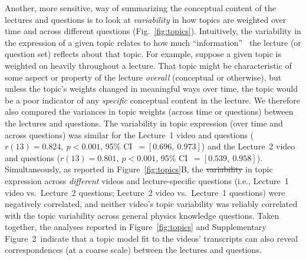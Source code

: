 \documentclass[10pt]{article}
\newcommand{\topicWeights}{2}
\providecommand{\DIFaddtex}[1]{{\protect\color{blue}\uwave{#1}}} %
\providecommand{\DIFdeltex}[1]{{\protect\color{red}\sout{#1}}}                      %
\providecommand{\DIFaddbegin}{} %
\providecommand{\DIFaddend}{} %
\providecommand{\DIFdelbegin}{} %
\providecommand{\DIFdelend}{} %
\providecommand{\DIFadd}[1]{\texorpdfstring{\DIFaddtex{#1}}{#1}} %
\providecommand{\DIFdel}[1]{\texorpdfstring{\DIFdeltex{#1}}{}} %
\newcommand{\DIFscaledelfig}{0.5}
\newlength{\DIFdelgraphicswidth} %
\newlength{\DIFdelgraphicsheight} %
\newcommand{\DIFaddincludegraphics}[2][]{{\color{blue}\fbox{\DIFOincludegraphics[#1]{#2}}}} %
\newcommand{\DIFdelincludegraphics}[2][]{%
\sbox{\DIFdelgraphicsbox}{\DIFOincludegraphics[#1]{#2}}%
\settoboxwidth{\DIFdelgraphicswidth}{\DIFdelgraphicsbox} %
\settoboxtotalheight{\DIFdelgraphicsheight}{\DIFdelgraphicsbox} %
\scalebox{\DIFscaledelfig}{%
\parbox[b]{\DIFdelgraphicswidth}{\usebox{\DIFdelgraphicsbox}\\[-\baselineskip] \rule{\DIFdelgraphicswidth}{0em}}\llap{\resizebox{\DIFdelgraphicswidth}{\DIFdelgraphicsheight}{%
\setlength{\unitlength}{\DIFdelgraphicswidth}%
\begin{picture}(1,1)%
\thicklines\linethickness{2pt} %
{\color[rgb]{1,0,0}\put(0,0){\framebox(1,1){}}}%
{\color[rgb]{1,0,0}\put(0,0){\line( 1,1){1}}}%
{\color[rgb]{1,0,0}\put(0,1){\line(1,-1){1}}}%
\end{picture}%
}\hspace*{3pt}}} %
} %
\DeclareRobustCommand{\DIFaddbegin}{\DIFOaddbegin \let\includegraphics\DIFaddincludegraphics} %
\DeclareRobustCommand{\DIFaddend}{\DIFOaddend \let\includegraphics\DIFOincludegraphics} %
\DeclareRobustCommand{\DIFdelbegin}{\DIFOdelbegin \let\includegraphics\DIFdelincludegraphics} %
\DeclareRobustCommand{\DIFdelend}{\DIFOaddend \let\includegraphics\DIFOincludegraphics} %
\begin{document}
Another, more sensitive, way of summarizing the conceptual content of the
lectures and questions is to look at \textit{variability} in how topics are
weighted over time and across different questions (Fig.~\ref{fig:topics}).
Intuitively, the variability in the expression of a given topic relates to how
much ``information''~\citep{Fish22} the lecture (or question set) reflects
about that topic. For example, suppose a given topic is weighted on heavily
throughout a lecture. That topic might be characteristic of some aspect or
property of the lecture \textit{overall} (conceptual or otherwise), but unless
the topic's weights changed in meaningful ways over time, the topic would be a
poor indicator of any \textit{specific} conceptual content in the lecture. We
therefore also compared the variances in topic weights (across time or
questions) between the lectures and questions. The variability in topic
expression (over time and across questions) was similar for the Lecture~1 video
and questions ($r(13) = 0.824,~p<0.001$, 95\% CI~$= [0.696,~0.973]$) and the
Lecture~2 video and questions ($r(13) = 0.801,~p<0.001$, 95\% CI~$=
[0.539,~0.958]$). Simultaneously, as reported in Figure~\ref{fig:topics}B, the
\DIFdelbegin \DIFdel{variability }\DIFdelend \DIFaddbegin \DIFadd{variabilities }\DIFaddend in topic expression across \textit{different} videos and
lecture-specific questions (i.e., Lecture~1 video vs.~Lecture~2 questions;
Lecture~2 video vs.~Lecture~1 questions) were negatively correlated, and
neither video's topic variability was reliably correlated with the topic
variability across general physics knowledge questions. Taken together, the
analyses reported in Figure~\ref{fig:topics} and Supplementary
Figure~\topicWeights~indicate that a topic model fit to the videos' transcripts
can also reveal correspondences (at a coarse scale) between the lectures and
questions.
\end{document}
